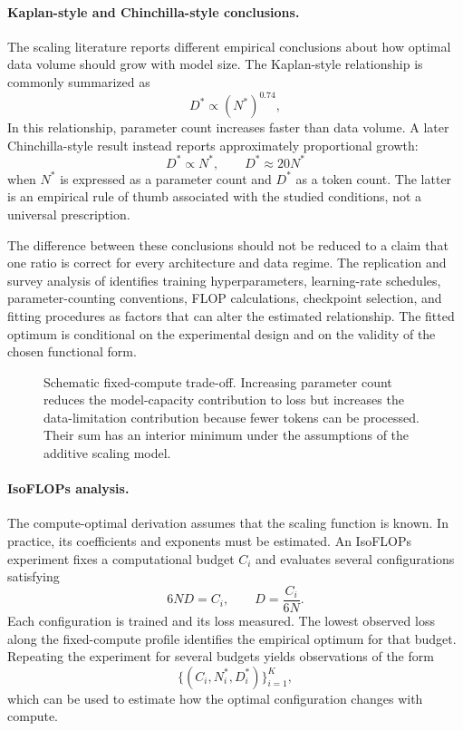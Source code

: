 \paragraph{Kaplan-style and Chinchilla-style conclusions.}
The scaling literature reports different empirical conclusions about how
optimal data volume should grow with model size. The Kaplan-style relationship
is commonly summarized as
\begin{equation}
    D^*\propto (N^*)^{0.74},
    \label{eq:scaling-kaplan-ratio}
\end{equation}
In this relationship, parameter count increases faster than data volume.
A later Chinchilla-style result instead reports approximately proportional
growth:
\begin{equation}
    D^*\propto N^*,
    \qquad
    D^*\approx 20N^*
    \label{eq:scaling-chinchilla-ratio}
\end{equation}
when \(N^*\) is expressed as a parameter count and \(D^*\) as a token count.
The latter is an empirical rule of thumb associated with the studied
conditions, not a universal prescription.

The difference between these conclusions should not be reduced to a claim
that one ratio is correct for every architecture and data regime. The
replication and survey analysis of \textcite{Li2025MisFitting} identifies
training hyperparameters, learning-rate schedules, parameter-counting
conventions, FLOP calculations, checkpoint selection, and fitting procedures
as factors that can alter the estimated relationship. The fitted optimum is
conditional on the experimental design and on the validity of the chosen
functional form.

\begin{figure}[htbp]
    \centering
    
    \caption{Schematic fixed-compute trade-off. Increasing parameter count
    reduces the model-capacity contribution to loss but increases the
    data-limitation contribution because fewer tokens can be processed.
    Their sum has an interior minimum under the assumptions of the additive
    scaling model.}
    \label{fig:scaling-compute-optimal}
\end{figure}

\paragraph{IsoFLOPs analysis.}
The compute-optimal derivation assumes that the scaling function is known.
In practice, its coefficients and exponents must be estimated. An IsoFLOPs
experiment fixes a computational budget \(C_i\) and evaluates several
configurations satisfying
\begin{equation}
    6ND=C_i,
    \qquad
    D=\frac{C_i}{6N}.
    \label{eq:scaling-isoflops}
\end{equation}
Each configuration is trained and its loss measured. The lowest observed
loss along the fixed-compute profile identifies the empirical optimum for
that budget. Repeating the experiment for several budgets yields observations
of the form
\[
    \{(C_i,N_i^*,D_i^*)\}_{i=1}^{K},
\]
which can be used to estimate how the optimal configuration changes with
compute.

